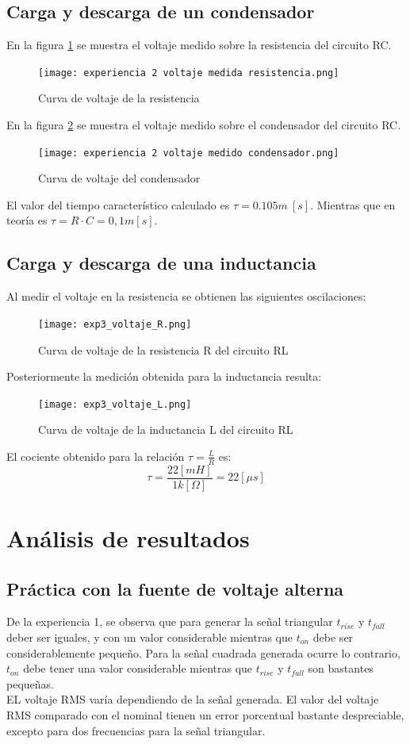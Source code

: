 \documentclass[letterpaper,11pt]{article} %
\begin{document}
\subsection{Carga y descarga de un condensador}
En la figura \ref{experiencia 2 voltaje resistencia} se muestra el voltaje medido sobre la resistencia del circuito RC. 
\begin{figure}
    \centering    
    \texttt{[image: experiencia 2 voltaje medida resistencia.png]}
    \caption{Curva de voltaje de la resistencia}
     \label{experiencia 2 voltaje resistencia}
\end{figure}
En la figura \ref{experiencia 2 voltaje condensador} se muestra el voltaje medido sobre el condensador del circuito RC.
\begin{figure}
    \centering    
    \texttt{[image: experiencia 2 voltaje medido condensador.png]}
    \caption{Curva de voltaje del condensador}
    \label{experiencia 2 voltaje condensador}
\end{figure}
El valor del tiempo característico calculado es $\tau=0.105m~[s]$. Mientras que en teoría es $\tau=R\cdot C= 0,1m [s]$. 
\subsection{Carga y descarga de una inductancia}
Al medir el voltaje en la resistencia se obtienen las siguientes oscilaciones:
\begin{figure}
    \centering
    \texttt{[image: exp3\_voltaje\_R.png]}
    \caption{Curva de voltaje de la resistencia R del circuito RL}
    \label{fig:exp3_voltaje}
\end{figure}

Posteriormente la medición obtenida para la inductancia resulta:
\begin{figure}
    \centering
    \texttt{[image: exp3\_voltaje\_L.png]}
    \caption{Curva de voltaje de la inductancia L del circuito RL}
    \label{fig:exp3_inductancia}
\end{figure}

El cociente obtenido para la relación $\tau = \frac{L}{R}$ es:
$$\tau = \frac{22[mH]}{1k[\Omega]} = 22[\mu s] $$

\newpage
\section{Análisis de resultados}
\subsection{Práctica con la fuente de voltaje alterna}
De la experiencia 1, se observa que para generar la señal triangular $t_{rise}$ y $t_{fall}$ deber ser iguales, y con un valor considerable mientras que $t_{on}$ debe ser considerablemente pequeño. Para la señal cuadrada generada ocurre lo contrario, $t_{on}$ debe tener una valor considerable mientras que $t_{rise}$ y $t_{fall}$ son bastantes pequeñas.\\
EL voltaje RMS varía  dependiendo de la señal generada. El valor del voltaje RMS comparado con el nominal tienen un error porcentual bastante despreciable, excepto
para dos frecuencias para la señal triangular.
\end{document}
